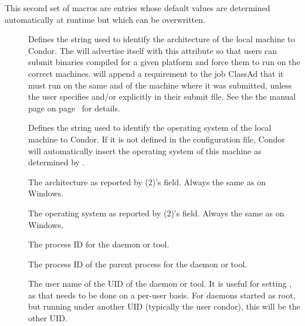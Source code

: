 This second set of macros are entries whose default values are
determined automatically at runtime but which can be overwritten.  
\begin{description}

\item[] \label{param:Arch}
  Defines the string
  used to identify the architecture of the local machine to Condor.
  The  will advertise itself with this attribute so
  that users can submit binaries compiled for a given platform and
  force them to run on the correct machines.   will
  append a requirement to the job ClassAd that it must
  run on the same  and  of the machine where
  it was submitted, unless the user specifies  and/or
   explicitly in their submit file.  See the
  the  manual page
  on page~\pageref{man-condor-submit} for details.

\item[] \label{param:OpSys}
  Defines the string used to identify the operating system
  of the local machine to Condor.
  If it is not defined in the configuration file, Condor will
  automatically insert the operating system of this machine as
  determined by .

\item[] \label{param:UnameArch}
  The architecture as reported by (2)'s  field.
  Always the same as  on Windows.

\item[] \label{param:UnameOpsys}
  The operating system as reported by (2)'s  field.
  Always the same as  on Windows.

\item[] \label{param:Pid}
  The process ID for the daemon or tool.

\item[] \label{param:Ppid}
  The process ID of the parent process for the daemon or tool.

\item[] \label{param:Username}
  The user name of the UID of the daemon or tool.
  It is useful for setting ,
  as that needs to be done on a per-user basis.
  For daemons started as root, but running under another UID
  (typically the user condor), this will be the other UID.


\end{description}

